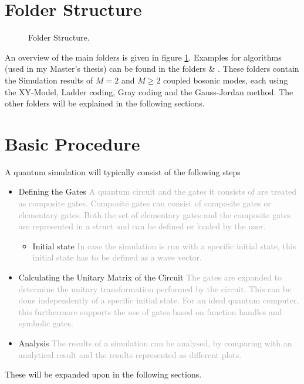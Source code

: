 \section{Folder Structure}
\begin{figure}[htb]
 \centering
 \caption{\label{fig:overview} Folder Structure.}
\end{figure}
An overview of the main folders is given in figure \ref{fig:overview}. Examples for algorithms (used in my Master's thesis) can be found in the folders  \& . These folders contain the Simulation results of $M=2$ and $M\geq2$ coupled bosonic modes, each using the XY-Model, Ladder coding, Gray coding and the Gauss-Jordan method. The other folders will be explained in the following sections.

\section{Basic Procedure}
A quantum simulation will typically consist of the following steps
\begin{itemize}
  \item Defining the Gates \textcolor{darkgray}{A quantum circuit and the gates it consists of are treated as composite gates. Composite gates can consist of composite gates or elementary gates. Both the set of elementary gates and the composite gates are represented in a struct and can be defined or loaded by the user. }
  \begin{itemize}
    \item Initial state \textcolor{darkgray}{In case the simulation is run with a specific initial state, this initial state has to be defined as a wave vector.}
  \end{itemize}
  \item Calculating the Unitary Matrix of the Circuit \textcolor{darkgray}{The gates are expanded to determine the unitary transformation performed by the circuit. This can be done independently of a specific initial state. For an ideal quantum computer, this furthermore supports the use of gates based on function handles and symbolic gates. }
  \item Analysis \textcolor{darkgray}{The results of a simulation can be analysed, by comparing with an analytical result and the results represented as different plots. }
\end{itemize}
These will be expanded upon in the following sections.

